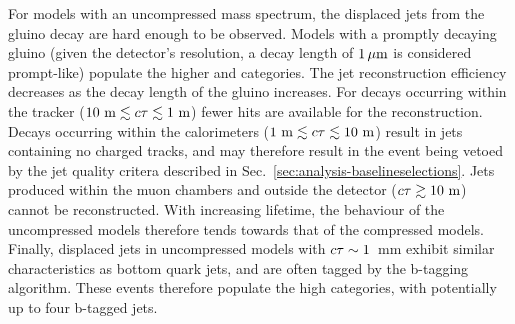For models with an uncompressed mass spectrum, the displaced jets from the 
gluino decay are hard enough to be observed. Models with a promptly decaying 
gluino (given the detector's resolution, a decay length of $1\,{\mu}\text{m}$ is considered 
prompt-like) populate the higher \njet and \scalht categories. The jet 
reconstruction efficiency decreases as the decay length of the gluino 
increases. For decays occurring within the tracker ($10~\mathrm{m} \lesssim 
c\tau \lesssim 1~\mathrm{m}$) 
fewer hits are available for the reconstruction. 
Decays occurring within the calorimeters ($1~\mathrm{m} \lesssim c\tau \lesssim 
10~\mathrm{m}$) 
result in jets containing no charged tracks, and may therefore 
result in the event being vetoed by the jet quality critera described in 
Sec.~\ref{sec:analysis-baselineselections}. Jets produced within the muon 
chambers and outside the detector ($c\tau \gtrsim 10~\mathrm{m}$) cannot be 
reconstructed. With increasing lifetime, the behaviour of the uncompressed 
models therefore tends towards that of the compressed models. Finally, 
displaced jets in uncompressed models with $c\tau \sim 1$~mm exhibit similar 
characteristics as bottom quark jets, and are often tagged by the b-tagging 
algorithm. These events therefore populate the high \nb categories, with 
potentially up to four b-tagged jets.





